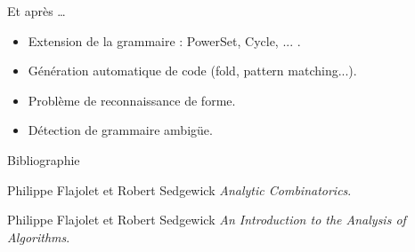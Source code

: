 \documentclass{beamer}
\begin{document}
\begin{frame}{Et après \ldots}
\begin{itemize}
\item Extension de la grammaire : PowerSet, Cycle, ... .
\item Génération automatique de code (fold, pattern matching...).
\item Problème de reconnaissance de forme.
\item Détection de grammaire ambigüe.
\end{itemize}
\end{frame}
\begin{frame}{Bibliographie}
  
  \begin{thebibliography}{9}
    Philippe Flajolet et Robert Sedgewick
    \emph{ Analytic Combinatorics}.

    Philippe Flajolet et Robert Sedgewick
    \emph{An Introduction to the Analysis of Algorithms}.

  \end{thebibliography}

\end{frame}
\end{document}
